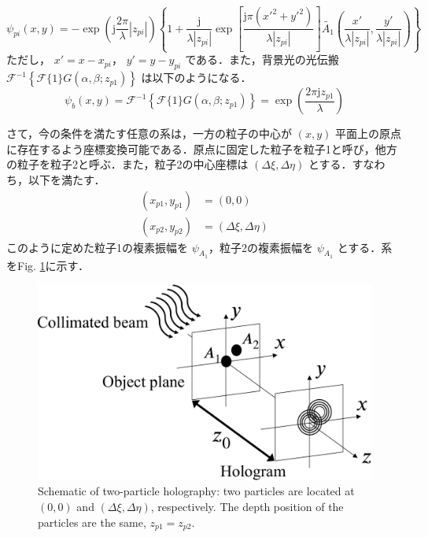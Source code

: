\begin{equation}
    \label{th:vikramEq4.8}
    \psi_{pi}(x,y) = -\exp{\left(\mathrm{j}\frac{2\pi}{\lambda}|z_{pi}|\right)} \left\{ 1 + \frac{\mathrm{j}}{\lambda |z_{pi}|} \exp{ \left[ \frac{\mathrm{j} \pi \left( x'^2 + y'^2 \right)}{\lambda |z_{pi}|} \right]} \tilde{A_1} \left(\frac{x'}{\lambda |z_{pi}|},\frac{y'}{\lambda |z_{pi}|} \right)  \right\}
\end{equation}
ただし， $x' = x- x_{pi}$， $y' = y-y_{pi}$ である．また，背景光の光伝搬 $\mathcal{F}^{-1}\left\{ \mathcal{F}\{1\}G(\alpha,\beta;z_{p1}) \right\}$ は以下のようになる．
\begin{equation}
    \psi_b(x,y) = \mathcal{F}^{-1}\left\{ \mathcal{F}\{1\}G(\alpha,\beta;z_{p1}) \right\} = \exp{\left(\frac{2\pi \mathrm{j}z_{p1}}{\lambda}\right)}
\end{equation}

さて，今の条件を満たす任意の系は，一方の粒子の中心が $(x,y)$ 平面上の原点に存在するよう座標変換可能である．原点に固定した粒子を粒子1と呼び，他方の粒子を粒子2と呼ぶ．また，粒子2の中心座標は $(\Delta \xi, \Delta \eta)$ とする．すなわち，以下を満たす．
\begin{align}
    \left( x_{p1}, y_{p1} \right) &= (0,0) \\
    \left( x_{p2}, y_{p2} \right) &= (\Delta \xi ,\Delta \eta)
\end{align}
このように定めた粒子1の複素振幅を $\psi_{A_1}$，粒子2の複素振幅を $\psi_{A_1}$ とする．系をFig. \ref{fig:twoParticleHolography}に示す．

\begin{figure}[htbp]
    \centering
    \includegraphics[width=0.8\linewidth]{./Figure/2_Theory/two_particle.pdf}
    \caption{Schematic of two-particle holography: two particles are located at $(0,0)$ and $(\Delta \xi, \Delta \eta)$, respectively. The depth position of the particles are the same, $z_{p1} = z_{p2}$.}
    \label{fig:twoParticleHolography}
\end{figure}

